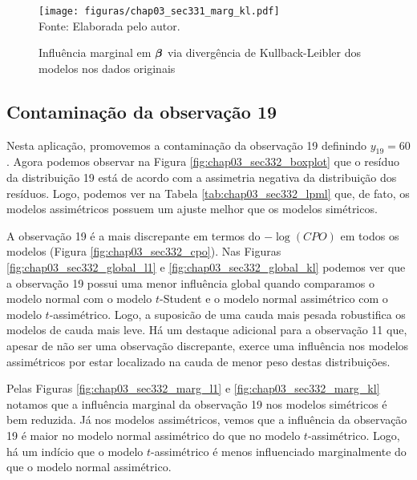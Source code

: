 \begin{figure}[H]
\begin{center}
\caption{Influência marginal em ${\boldsymbol{\beta}}$ via divergência de Kullback-Leibler dos modelos nos dados originais}
\label{fig:chap03_sec331_marg_kl}
\texttt{[image: figuras/chap03\_sec331\_marg\_kl.pdf]}
\\ Fonte: Elaborada pelo autor.
\end{center}
\end{figure}

\subsection{Contaminação da observação 19}\label{sec:cont19}

Nesta aplicação, promovemos a contaminação da observação 19 definindo $y_{19} = 60$. Agora podemos observar na Figura \ref{fig:chap03_sec332_boxplot} que o resíduo da distribuição 19 está de acordo com a assimetria negativa da distribuição dos resíduos. Logo, podemos ver na Tabela \ref{tab:chap03_sec332_lpml} que, de fato, os modelos assimétricos possuem um ajuste melhor que os modelos simétricos.

A observação 19 é a mais discrepante em termos do $-\log(CPO)$ em todos os modelos (Figura \ref{fig:chap03_sec332_cpo}). Nas Figuras \ref{fig:chap03_sec332_global_l1} e \ref{fig:chap03_sec332_global_kl} podemos ver que a observação 19 possui uma menor influência global quando comparamos o modelo normal com o modelo $t$-Student e o modelo normal assimétrico com o modelo $t$-assimétrico. Logo, a suposicão de uma cauda mais pesada robustifica os modelos de cauda mais leve. Há um destaque adicional para a observação 11 que, apesar de não ser uma observação discrepante, exerce uma influência nos modelos assimétricos por estar localizado na cauda de menor peso destas distribuições.

Pelas Figuras \ref{fig:chap03_sec332_marg_l1} e \ref{fig:chap03_sec332_marg_kl} notamos que a influência marginal da observação 19 nos modelos simétricos é bem reduzida. Já nos modelos assimétricos, vemos que a influência da observação 19 é maior no modelo normal assimétrico do que no modelo $t$-assimétrico. Logo, há um indício que o modelo $t$-assimétrico é menos influenciado marginalmente do que o modelo normal assimétrico.  

